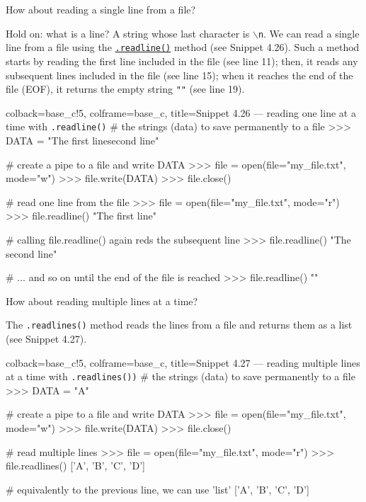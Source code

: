 \documentclass[a4paper,11pt]{book}
\numberwithin{figure}{chapter}
\numberwithin{table}{chapter}
\newcommand{\question}[1]{%
    \begin{tcolorbox}[colback=comp_c!10,colframe=comp_c,sidebyside align=top,width=\linewidth,before skip=1ex]
        #1
    \end{tcolorbox}%
    \switchcolumn%
}
\newcommand{\note}[1]{%
    \begin{tcolorbox}[colback=white!0,colframe=white!10,width=\linewidth,before skip=1ex]
        #1
    \end{tcolorbox}         
}
\begin{document}
\begin{paracol}{2}
	\question{\raggedright How about reading a single line from a file?}
	\note{Hold on: what is a line? A string whose last character is \texttt{$\backslash$n}. We can read a single line from a file using the \href{https://docs.python.org/3/tutorial/inputoutput.html#methods-of-file-objects}{\texttt{.readline()}} method (see Snippet 4.26). Such a method starts by reading the first line included in the file (see line 11); then, it reads any subsequent lines included in the file (see line 15); when it reaches the end of the file (EOF), it returns the empty string \texttt{""} (see line 19).}
\end{paracol}
\clearpage 

\begin{pythoncode}[linenos=true,]{colback=base_c!5, colframe=base_c, title=\sffamily Snippet 4.26 --- reading one line at a time with \texttt{.readline()}}
# the strings (data) to save permanently to a file
>>> DATA = "The first line\nThe second line" 

# create a pipe to a file and write DATA
>>> file = open(file="my_file.txt", mode="w")
>>> file.write(DATA)
>>> file.close()

# read one line from the file
>>> file = open(file="my_file.txt", mode="r")
>>> file.readline()
"The first line\n"

# calling file.readline() again reds the subsequent line 
>>> file.readline()
"The second line"

# ... and so on until the end of the file is reached
>>> file.readline()
""
\end{pythoncode}

\begin{paracol}{2}
	\question{\raggedright How about reading multiple lines at a time?}
	\note{The \texttt{.readlines()} method reads the lines from a file and returns them as a list (see Snippet 4.27).}
\end{paracol}

\begin{pythoncode}[linenos=true,]{colback=base_c!5, colframe=base_c, title=\sffamily Snippet 4.27 --- reading multiple lines at a time with \texttt{.readlines())}}
# the strings (data) to save permanently to a file
>>> DATA = "A\nB\nC\nD" 

# create a pipe to a file and write DATA
>>> file = open(file="my_file.txt", mode="w")
>>> file.write(DATA)
>>> file.close()

# read multiple lines 
>>> file = open(file="my_file.txt", mode="r")
>>> file.readlines()
['A\n', 'B\n', 'C\n', 'D']

# equivalently to the previous line, we can use 'list'
['A\n', 'B\n', 'C\n', 'D']
\end{pythoncode}	
\end{document}
